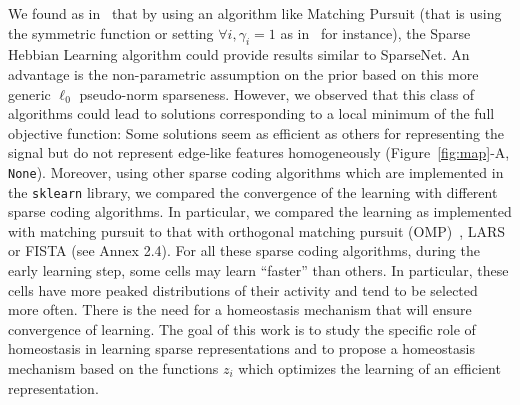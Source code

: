 \documentclass[letterpaper,final,conference,10pt]{IEEEtran}
\newcommand{\citep}[1]{\cite{#1}}
\newcommand{\seeFig}[1]{Figure~\ref{fig:#1}}%
\begin{document}
We found as in~\citep{Rehn07} that by using an algorithm like Matching Pursuit (that is using the symmetric function or setting $\forall i, \gamma_i=1$ as in~\citep{Mairal14} for instance), the Sparse Hebbian Learning algorithm could provide results similar to {\sc SparseNet}. An advantage is the non-parametric assumption on the prior based on this more generic $\ell_0$ pseudo-norm sparseness. However, we observed that this class of algorithms could lead to solutions corresponding to a local minimum of the full objective function: Some solutions seem as efficient as others for representing the signal but do not represent edge-like features homogeneously (\seeFig{map}-A, \texttt{None}). %
Moreover, using other sparse coding algorithms which are implemented in the \verb+sklearn+ library, we compared the convergence of the learning with different sparse coding algorithms. In particular, we compared the learning as implemented with matching pursuit to that with orthogonal matching pursuit (OMP)~\citep{pati1993orthogonal}, LARS or FISTA (see Annex 2.4). %
For all these sparse coding algorithms, during the early learning step, some cells may learn ``faster'' than others. In particular, these cells have more peaked distributions of their activity and tend to be selected more often. There is the need for a homeostasis mechanism that will ensure convergence of learning. The goal of this work is to study the specific role of homeostasis in learning sparse representations and to propose a homeostasis mechanism based on the functions $z_i$ which optimizes the learning of an efficient representation.%
\end{document}
